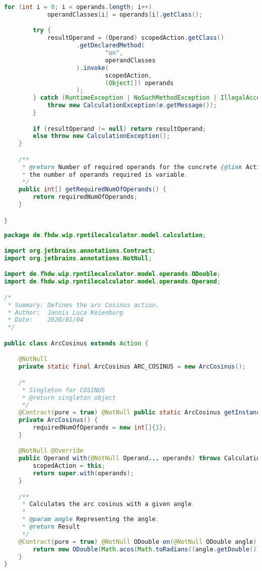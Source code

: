 \begin{lstlisting}[caption=Action (Schwenke),label=list:Action,language=Java]
        for (int i = 0; i < operands.length; i++)
            operandClasses[i] = operands[i].getClass();

        try {
            resultOperand = (Operand) scopedAction.getClass()
                    .getDeclaredMethod(
                            "on",
                            operandClasses
                    ).invoke(
                            scopedAction,
                            (Object[]) operands
                    );
        } catch (RuntimeException | NoSuchMethodException | IllegalAccessException | InvocationTargetException e) {
            throw new CalculationException(e.getMessage());
        }

        if (resultOperand != null) return resultOperand;
        else throw new CalculationException();
    }

    /**
     * @return Number of required operands for the concrete {@link Action}. If {@code -1}
     * the number of operands required is variable.
     */
    public int[] getRequiredNumOfOperands() {
        return requiredNumOfOperands;
    }

}
\end{lstlisting}    

\begin{lstlisting}[caption=ArcCosinus (Keienburg),label=list:ArcCosinus,language=Java]
package de.fhdw.wip.rpntilecalculator.model.calculation;

import org.jetbrains.annotations.Contract;
import org.jetbrains.annotations.NotNull;

import de.fhdw.wip.rpntilecalculator.model.operands.ODouble;
import de.fhdw.wip.rpntilecalculator.model.operands.Operand;

/*
 * Summary: Defines the arc Cosinus action.
 * Author:  Jannis Luca Keienburg
 * Date:    2020/01/04
 */

public class ArcCosinus extends Action {

    @NotNull
    private static final ArcCosinus ARC_COSINUS = new ArcCosinus();

    /*
     * Singleton for COSINUS
     * @return singleton object
     */
    @Contract(pure = true) @NotNull public static ArcCosinus getInstance() { return ARC_COSINUS; }
    private ArcCosinus() {
        requiredNumOfOperands = new int[]{1};
    }

    @NotNull @Override
    public Operand with(@NotNull Operand... operands) throws CalculationException {
        scopedAction = this;
        return super.with(operands);
    }

    /**
     * Calculates the arc cosinus with a given angle.
     * 
     * @param angle Representing the angle.
     * @return Result
     */
    @Contract(pure = true) @NotNull ODouble on(@NotNull ODouble angle) {
        return new ODouble(Math.acos(Math.toRadians((angle.getDouble()))));
    }
}
\end{lstlisting}    

